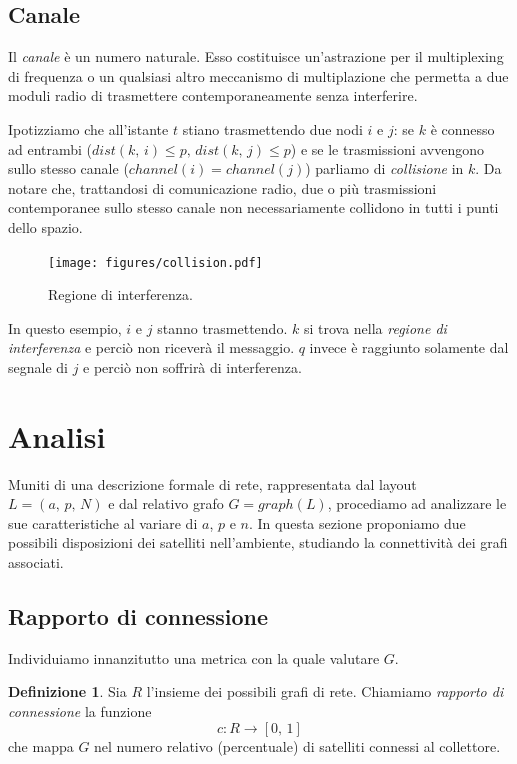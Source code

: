 \documentclass[a4paper,11pt]{article}
\theoremstyle{definition}
\newtheorem{definition}{Definizione}
\begin{document}
\subsection{Canale}

Il \emph{canale} è un numero naturale. Esso costituisce un'astrazione per il multiplexing di frequenza o un qualsiasi altro meccanismo di multiplazione che permetta a due moduli radio di trasmettere contemporaneamente senza interferire.

Ipotizziamo che all'istante $t$ stiano trasmettendo due nodi $i$ e $j$: se $k$ è connesso ad entrambi ($dist(k,\,i) \leq p,\,dist(k,\,j) \leq p$) e se le trasmissioni avvengono sullo stesso canale ($channel(i) = channel(j)$) parliamo di \emph{collisione} in $k$. Da notare che, trattandosi di comunicazione radio, due o più trasmissioni contemporanee sullo stesso canale non necessariamente collidono in tutti i punti dello spazio.

\begin{figure}[H]
\centering
\texttt{[image: figures/collision.pdf]}
\caption{Regione di interferenza.}
\end{figure}

In questo esempio, $i$ e $j$ stanno trasmettendo. $k$ si trova nella \emph{regione di interferenza} e perciò non riceverà il messaggio. $q$ invece è raggiunto solamente dal segnale di $j$ e perciò non soffrirà di interferenza.

\section{Analisi}

Muniti di una descrizione formale di rete, rappresentata dal layout $L = (a,\,p,\,N)$ e dal relativo grafo $G = graph(L)$, procediamo ad analizzare le sue caratteristiche al variare di $a$, $p$ e $n$. In questa sezione proponiamo due possibili disposizioni dei satelliti nell'ambiente, studiando la connettività dei grafi associati.

\subsection{Rapporto di connessione}

Individuiamo innanzitutto una metrica con la quale valutare $G$.

\begin{definition}
Sia $R$ l'insieme dei possibili grafi di rete. Chiamiamo \emph{rapporto di connessione} la funzione
\begin{equation*}
c \colon R \to [0,\,1]
\end{equation*}
che mappa $G$ nel numero relativo (percentuale) di satelliti connessi al collettore.
\end{definition}
\end{document}

